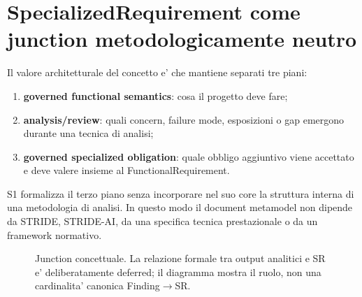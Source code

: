 \documentclass[11pt,a4paper]{article}
\begin{document}
\section{SpecializedRequirement come junction metodologicamente neutro}

Il valore architetturale del concetto e' che mantiene separati tre piani:

\begin{enumerate}
  \item \textbf{governed functional semantics}: cosa il progetto deve fare;
  \item \textbf{analysis/review}: quali concern, failure mode, esposizioni o gap emergono durante una tecnica di analisi;
  \item \textbf{governed specialized obligation}: quale obbligo aggiuntivo viene accettato e deve valere insieme al FunctionalRequirement.
\end{enumerate}

S1 formalizza il terzo piano senza incorporare nel suo core la struttura interna di una metodologia di analisi. In questo modo il document metamodel non dipende da STRIDE, STRIDE-AI, da una specifica tecnica prestazionale o da un framework normativo.

\begin{figure}[h]
\centering
{}
\caption{Junction concettuale. La relazione formale tra output analitici e SR e' deliberatamente deferred; il diagramma mostra il ruolo, non una cardinalita' canonica Finding$\rightarrow$SR.}
\end{figure}
\end{document}
